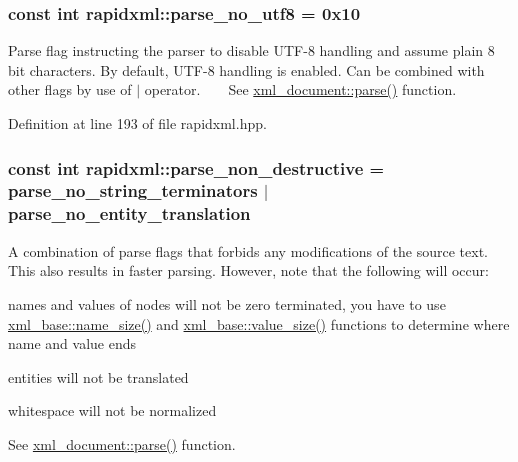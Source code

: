 \subsubsection[{\texorpdfstring{parse\+\_\+no\+\_\+utf8}{parse_no_utf8}}]{\setlength{\rightskip}{0pt plus 5cm}const int rapidxml\+::parse\+\_\+no\+\_\+utf8 = 0x10}\hypertarget{namespacerapidxml_a22d4aefaceb00d7afabfef7107b108da}{}\label{namespacerapidxml_a22d4aefaceb00d7afabfef7107b108da}
Parse flag instructing the parser to disable U\+T\+F-\/8 handling and assume plain 8 bit characters. By default, U\+T\+F-\/8 handling is enabled. Can be combined with other flags by use of $\vert$ operator. ~\newline
~\newline
 See \hyperlink{classrapidxml_1_1xml__document_ac6e73ff9ac323bf5a370c38feb03a6b1}{xml\+\_\+document\+::parse()} function. 

Definition at line 193 of file rapidxml.\+hpp.

\subsubsection[{\texorpdfstring{parse\+\_\+non\+\_\+destructive}{parse_non_destructive}}]{\setlength{\rightskip}{0pt plus 5cm}const int rapidxml\+::parse\+\_\+non\+\_\+destructive = {\bf parse\+\_\+no\+\_\+string\+\_\+terminators} $\vert$ {\bf parse\+\_\+no\+\_\+entity\+\_\+translation}}\hypertarget{namespacerapidxml_a45d4d8fef551beaaba23a83b847fd6a3}{}\label{namespacerapidxml_a45d4d8fef551beaaba23a83b847fd6a3}
A combination of parse flags that forbids any modifications of the source text. This also results in faster parsing. However, note that the following will occur\+: 
\begin{DoxyItemize}
\item names and values of nodes will not be zero terminated, you have to use \hyperlink{classrapidxml_1_1xml__base_a7e7f98b3d01e1eab8dc1ca69aad9af84}{xml\+\_\+base\+::name\+\_\+size()} and \hyperlink{classrapidxml_1_1xml__base_a9fcf201ed0915ac18dd43b0b5dcfaf32}{xml\+\_\+base\+::value\+\_\+size()} functions to determine where name and value ends 
\item entities will not be translated 
\item whitespace will not be normalized 
\end{DoxyItemize}See \hyperlink{classrapidxml_1_1xml__document_ac6e73ff9ac323bf5a370c38feb03a6b1}{xml\+\_\+document\+::parse()} function. 

